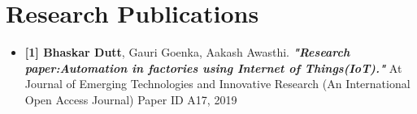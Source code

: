 \documentclass[10pt]{report}
\begin{document}
\section*{\color{BlueViolet}\faUniversity\hspace{1pt} Research Publications} %
\begin{itemize}
	\item \textbf{[1] Bhaskar Dutt}, Gauri Goenka, Aakash Awasthi. \textbf{\textit{"Research paper:Automation in factories using Internet of Things(IoT)."}} At Journal of Emerging Technologies and Innovative Research (An International Open Access Journal) Paper ID A17, 2019 %
\end{itemize}
\end{document}
